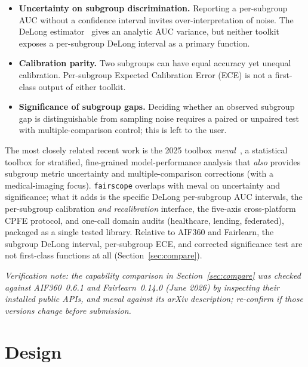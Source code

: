 \documentclass[11pt]{article}
\begin{document}
\begin{itemize}
  \item \textbf{Uncertainty on subgroup discrimination.} Reporting a per-subgroup AUC without
    a confidence interval invites over-interpretation of noise. The DeLong
    estimator~\cite{delong} gives an analytic AUC variance, but neither toolkit exposes a
    per-subgroup DeLong interval as a primary function.
  \item \textbf{Calibration parity.} Two subgroups can have equal accuracy yet unequal
    calibration. Per-subgroup Expected Calibration Error (ECE) is not a first-class output of
    either toolkit.
  \item \textbf{Significance of subgroup gaps.} Deciding whether an observed subgroup gap is
    distinguishable from sampling noise requires a paired or unpaired test with
    multiple-comparison control; this is left to the user.
\end{itemize}

The most closely related recent work is the 2025 toolbox \emph{meval}~\cite{meval}, a
statistical toolbox for stratified, fine-grained model-performance analysis that
\emph{also} provides subgroup metric uncertainty and multiple-comparison corrections (with a
medical-imaging focus). \texttt{fairscope} overlaps with meval on uncertainty and
significance; what it adds is the specific DeLong per-subgroup AUC intervals, the per-subgroup
calibration \emph{and recalibration} interface, the five-axis cross-platform CPFE protocol,
and one-call domain audits (healthcare, lending, federated), packaged as a single tested
library. Relative to AIF360 and Fairlearn, the subgroup DeLong interval, per-subgroup ECE, and
corrected significance test are not first-class functions at all (Section~\ref{sec:compare}).

\emph{Verification note: the capability comparison in Section~\ref{sec:compare} was checked
against AIF360~0.6.1 and Fairlearn~0.14.0 (June 2026) by inspecting their installed public
APIs, and meval against its arXiv description; re-confirm if those versions change before
submission.}

\section{Design}
\end{document}
